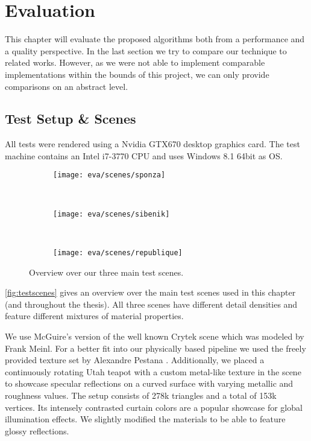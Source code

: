 \documentclass[thesis.tex]{subfiles}
\begin{document}
\chapter{Evaluation}\label{chap:eva}
This chapter will evaluate the proposed algorithms both from a performance and a quality perspective.
In the last section we try to compare our technique to related works.
However, as we were not able to implement comparable implementations within the bounds of this project, we can only provide comparisons on an abstract level.

\section{Test Setup \& Scenes} \label{sec:eva:setup}
All tests were rendered using a Nvidia GTX670 desktop graphics card.
The test machine contains an Intel i7-3770 CPU and uses Windows 8.1 64bit as OS.

\begin{figure}
\centering
\begin{subfigure}[b]{0.8\textwidth}
\centering
\texttt{[image: eva/scenes/sponza]}
\caption{}
\end{subfigure}
\\
\begin{subfigure}[b]{0.8\textwidth}
\centering
\texttt{[image: eva/scenes/sibenik]}
\caption{}
\end{subfigure}
\\
\begin{subfigure}[b]{0.8\textwidth}
\centering
\texttt{[image: eva/scenes/republique]}
\caption{}
\end{subfigure}
\caption{Overview over our three main test scenes.}
\label{fig:testscenes}
\end{figure}
\autoref{fig:testscenes} gives an overview over the main test scenes used in this chapter (and throughout the thesis).
All three scenes have different detail densities and feature different mixtures of material properties.

We use McGuire's \cite{bib:McGuire2011Data} version of the well known Crytek  scene which was modeled by Frank Meinl.
For a better fit into our physically based pipeline we used the freely provided texture set  by Alexandre Pestana \cite{bib:sponzapbr}.
Additionally, we placed a continuously rotating Utah teapot with a custom metal-like texture in the scene to showcase specular reflections on a curved surface with varying metallic and roughness values.
The setup consists of 278k triangles and a total of 153k vertices.
Its intensely contrasted curtain colors are a popular showcase for global illumination effects.
We slightly modified the materials to be able to feature glossy reflections.
\end{document}
